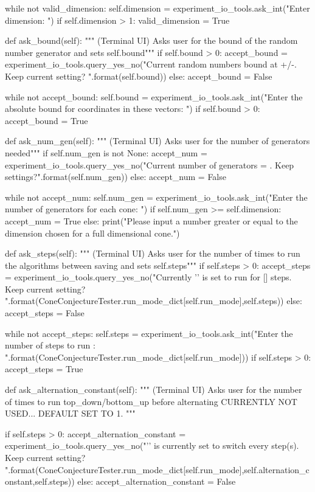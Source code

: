 \documentclass{TC}
\begin{document}
\begin{SAGE}
		while not valid_dimension:
			self.dimension = experiment_io_tools.ask_int("Enter dimension: ")
			if self.dimension > 1:
				valid_dimension = True

	def ask_bound(self):
		""" (Terminal UI) Asks user for the bound of the random number generator and sets self.bound"""
		if self.bound > 0:
			accept_bound = experiment_io_tools.query_yes_no("Current random numbers bound at +/-{}. Keep current setting? ".format(self.bound))
		else:
			accept_bound = False

		while not accept_bound:
			self.bound = experiment_io_tools.ask_int("Enter the absolute bound for coordinates in these vectors: ")
			if self.bound > 0:
				accept_bound = True

	def ask_num_gen(self):
		""" (Terminal UI) Asks user for the number of generators needed"""
		if self.num_gen is not None:
			accept_num = experiment_io_tools.query_yes_no("Current number of generators = {}. Keep settings?".format(self.num_gen))
		else:
			accept_num = False

		while not accept_num:
			self.num_gen = experiment_io_tools.ask_int("Enter the number of generators for each cone: ")
			if self.num_gen >= self.dimension:
				accept_num = True
			else:
				print("Please input a number greater or equal to the dimension chosen for a full dimensional cone.")



	def ask_steps(self):
		""" (Terminal UI) Asks user for the number of times to run the algorithms between saving and sets self.steps"""
		if self.steps > 0:
			accept_steps = experiment_io_tools.query_yes_no("Currently '{}' is set to run for [{}] steps. Keep current setting? ".format(ConeConjectureTester.run_mode_dict[self.run_mode],self.steps))
		else:
			accept_steps = False

		while not accept_steps:
			self.steps = experiment_io_tools.ask_int("Enter the number of steps to run {}: ".format(ConeConjectureTester.run_mode_dict[self.run_mode]))
			if self.steps > 0:
				accept_steps = True

	def ask_alternation_constant(self):
		""" (Terminal UI) Asks user for the number of times to run top_down/bottom_up before alternating
			CURRENTLY NOT USED... DEFAULT SET TO 1.
		"""
		
		if self.steps > 0:
			accept_alternation_constant = experiment_io_tools.query_yes_no("'{}' is currently set to switch every {} step(s). Keep current setting? ".format(ConeConjectureTester.run_mode_dict[self.run_mode],self.alternation_constant,self.steps))
		else:
			accept_alternation_constant = False


\end{SAGE}
\end{document}
